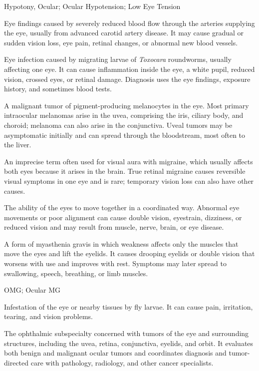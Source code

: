 \synonyms
Hypotony, Ocular; Ocular Hypotension; Low Eye Tension

 Eye findings caused by severely reduced blood flow through the arteries supplying the eye, usually from advanced carotid artery disease. It may cause gradual or sudden vision loss, eye pain, retinal changes, or abnormal new blood vessels.

 Eye infection caused by migrating larvae of \textit{Toxocara} roundworms, usually affecting one eye. It can cause inflammation inside the eye, a white pupil, reduced vision, crossed eyes, or retinal damage. Diagnosis uses the eye findings, exposure history, and sometimes blood tests.

 A malignant tumor of pigment-producing melanocytes in the eye. Most primary
intraocular melanomas arise in the uvea, comprising the iris, ciliary body, and choroid; melanoma can
also arise in the conjunctiva. Uveal tumors may be asymptomatic initially and can spread through the
bloodstream, most often to the liver.

 An imprecise term often used for visual aura with migraine, which usually affects both eyes because it arises in the brain. True retinal migraine causes reversible visual symptoms in one eye and is rare; temporary vision loss can also have other causes.

 The ability of the eyes to move together in a coordinated way. Abnormal eye movements or poor alignment can cause double vision, eyestrain, dizziness, or reduced vision and may result from muscle, nerve, brain, or eye disease.

 A form of myasthenia gravis in which weakness affects only the muscles that move the eyes and lift the eyelids. It causes drooping eyelids or double vision that worsens with use and improves with rest. Symptoms may later spread to swallowing, speech, breathing, or limb muscles.

\synonyms
OMG; Ocular MG

 Infestation of the eye or nearby tissues by fly larvae. It can cause pain, irritation, tearing, and vision problems.

 The ophthalmic subspecialty concerned with tumors of the eye and surrounding
structures, including the uvea, retina, conjunctiva, eyelids, and orbit. It evaluates both
benign and malignant ocular tumors and coordinates diagnosis and tumor-directed care with
pathology, radiology, and other cancer specialists.

